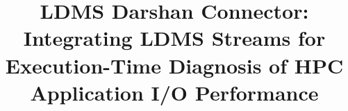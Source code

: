 \documentclass[conference]{IEEEtran}
\begin{document}
\title{LDMS Darshan Connector: Integrating LDMS Streams for Execution-Time Diagnosis of HPC Application I/O Performance}


\maketitle
\end{document}
